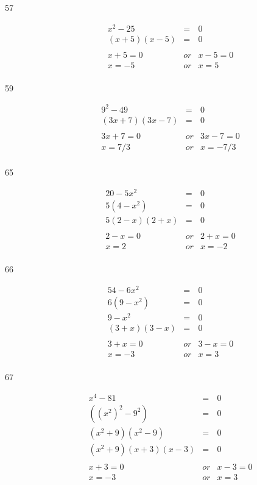 \documentclass[fleqn,addpoints]{exam}
\begin{document}
\begin{description}
\item[57]
\begin{eqnarray*}
  x^2 - 25 &=& 0 \\
  (x + 5)(x - 5) &=& 0 \\
\\
  x + 5 = 0 & or & x - 5 = 0 \\
  x = -5 & or & x = 5 \\
\end{eqnarray*}

\item[59]
\begin{eqnarray*}
  9^2 - 49 &=& 0 \\
  (3x + 7)(3x - 7) &=& 0 \\
\\
  3x + 7 = 0 & or & 3x - 7 = 0 \\
  x = 7/3 & or & x = -7/3 \\
\end{eqnarray*}

\item[65]
\begin{eqnarray*}
  20 - 5x^2 &=& 0 \\
  5(4 - x^2) &=& 0 \\
  5(2 - x)(2 + x) &=& 0 \\
\\
  2 - x = 0 & or & 2 + x = 0 \\
  x = 2 & or & x = -2 \\
\end{eqnarray*}

\item[66]
\begin{eqnarray*}
  54 - 6x^2 &=& 0 \\
  6(9 - x^2) &=& 0 \\
  9 - x^2 &=& 0 \\
  (3 + x)(3 - x) &=& 0 \\
\\
  3 + x = 0 & or & 3 - x = 0 \\
  x = -3 & or & x = 3 \\
\end{eqnarray*}

\item[67]
\begin{eqnarray*}
  x^4 - 81 &=& 0 \\
  ((x^2)^2 - 9^2) &=& 0 \\
  (x^2 + 9)(x^2 - 9) &=& 0 \\
  (x^2 + 9)(x + 3)(x - 3) &=& 0 \\
\\
  x + 3 = 0 & or & x - 3 = 0 \\
  x = -3 & or & x = 3 \\
\end{eqnarray*}


\end{description}
\end{document}
